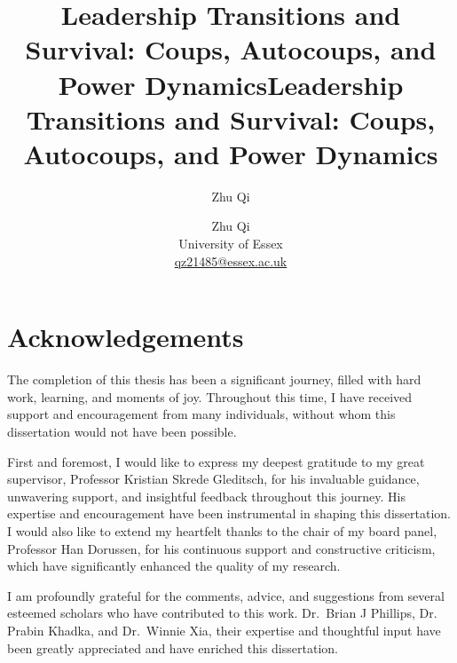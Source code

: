 \documentclass[
  12pt,
]{report}
\title{Leadership Transitions and Survival: Coups, Autocoups, and Power
Dynamics}
\author{Zhu Qi}
\date{}
\renewcommand*\contentsname{Table of contents}
\newcommand\contentsname{Table of contents}
\begin{document}
\def\spacingset#1{\renewcommand{\baselinestretch}%
{#1}\small\normalsize} \spacingset{1}



\title{\bf Leadership Transitions and Survival: Coups, Autocoups, and
Power Dynamics}
\author{
Zhu Qi\\University of
Essex\\\href{mailto:qz21485@essex.ac.uk}{qz21485@essex.ac.uk}
}

\maketitle

\bigskip
\bigskip
\begin{abstract}

\end{abstract}


\newpage
\spacingset{1.9} %
\renewcommand*\contentsname{Contents}
{
\hypersetup{linkcolor=}
\setcounter{tocdepth}{2}
\tableofcontents
}
\listoffigures
\listoftables

\chapter*{Acknowledgements}\label{acknowledgements}

The completion of this thesis has been a significant journey, filled
with hard work, learning, and moments of joy. Throughout this time, I
have received support and encouragement from many individuals, without
whom this dissertation would not have been possible.

First and foremost, I would like to express my deepest gratitude to my
great supervisor, Professor Kristian Skrede Gleditsch, for his
invaluable guidance, unwavering support, and insightful feedback
throughout this journey. His expertise and encouragement have been
instrumental in shaping this dissertation. I would also like to extend
my heartfelt thanks to the chair of my board panel, Professor Han
Dorussen, for his continuous support and constructive criticism, which
have significantly enhanced the quality of my research.

I am profoundly grateful for the comments, advice, and suggestions from
several esteemed scholars who have contributed to this work. Dr.~Brian J
Phillips, Dr. Prabin Khadka, and Dr.~Winnie Xia, their expertise and
thoughtful input have been greatly appreciated and have enriched this
dissertation.
\end{document}
